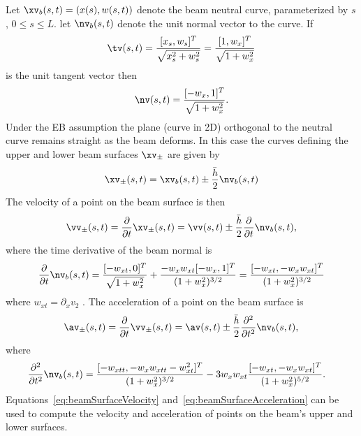 \documentclass[11pt]{article}
\newcommand{\hs}{\bar{h}}
\newcommand{\xbv}{\xv_b}
\newcommand{\nsv}{\nv_b}
\begin{document}
Let $\xbv(s,t)=(x(s),w(s,t))$ denote the beam neutral curve, parameterized by $s$, $0\le s \le L$.
let $\nsv(s,t)$ denote the unit normal vector to the curve. If 
\begin{align*}
   \tv(s,t)= \frac{[ x_s,w_s]^T}{\sqrt{x_s^2+w_s^2}} = \frac{[ 1,w_x]^T}{\sqrt{1+w_x^2}}
\end{align*}
is the unit tangent vector then
\begin{align*}
   \nv(s,t)= \frac{[ -w_x, 1]^T}{\sqrt{1+w_x^2}}. 
\end{align*}
Under the EB assumption the plane (curve in 2D) orthogonal to the neutral curve remains straight as the beam deforms.
In this case the curves defining the upper and lower beam surfaces $\xv_\pm$ are given by
\begin{align*}
   \xv_\pm(s,t) = \xbv(s,t) \pm \frac{\hs}{2} \nsv(s,t)
\end{align*}
The velocity of a point on the beam surface is then 
\begin{align}
   \vv_\pm(s,t) = \frac{\partial}{\partial t}\xv_\pm(s,t) =  \vv(s,t) \pm \frac{\hs}{2} \frac{\partial}{\partial t}\nsv(s,t),
       \label{eq:beamSurfaceVelocity}
\end{align}
where the time derivative of the beam normal is 
\begin{align*}
   \frac{\partial}{\partial t}\nsv(s,t) = \frac{[ -w_{xt}, 0]^T}{\sqrt{1+w_x^2}} + 
                 \frac{-w_x w_{xt} [-w_x, 1]^T}{(1+w_x^2)^{3/2}} = \frac{[ -w_{xt}, -w_x w_{xt}]^T}{(1+w_x^2)^{3/2}}
\end{align*}
where $w_{xt}=\partial_x v_2$ .
The acceleration of a point on the beam surface is
\begin{align}
   \av_\pm(s,t) = \frac{\partial}{\partial t}\vv_\pm(s,t) =  \av(s,t) \pm \frac{\hs}{2} \frac{\partial^2}{\partial t^2}\nsv(s,t),
   \label{eq:beamSurfaceAcceleration}
\end{align}
where 
\begin{align*}
   \frac{\partial^2}{\partial t^2}\nsv(s,t) %
        & = \frac{[ -w_{xtt}, -w_x w_{xtt} -w_{xt}^2 ]^T}{(1+w_x^2)^{3/2}} 
           - 3 w_x w_{xt} \frac{[ -w_{xt}, -w_x w_{xt}]^T}{(1+w_x^2)^{5/2}} .
\end{align*}
Equations~\eqref{eq:beamSurfaceVelocity} and~\eqref{eq:beamSurfaceAcceleration} can be used to compute
the velocity and acceleration of points on the beam's upper and lower surfaces.
\end{document}
